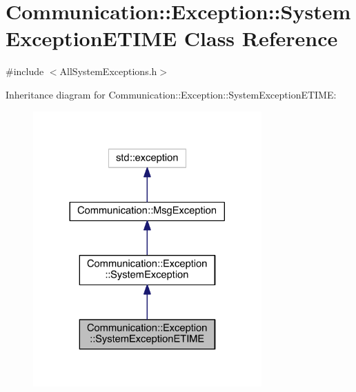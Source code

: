 \hypertarget{class_communication_1_1_exception_1_1_system_exception_e_t_i_m_e}{}\section{Communication\+:\+:Exception\+:\+:System\+Exception\+E\+T\+I\+M\+E Class Reference}
\label{class_communication_1_1_exception_1_1_system_exception_e_t_i_m_e}


{\ttfamily \#include $<$All\+System\+Exceptions.\+h$>$}



Inheritance diagram for Communication\+:\+:Exception\+:\+:System\+Exception\+E\+T\+I\+M\+E\+:\nopagebreak
\begin{figure}[H]
\begin{center}
\leavevmode
\includegraphics[width=248pt]{class_communication_1_1_exception_1_1_system_exception_e_t_i_m_e__inherit__graph}
\end{center}
\end{figure}


